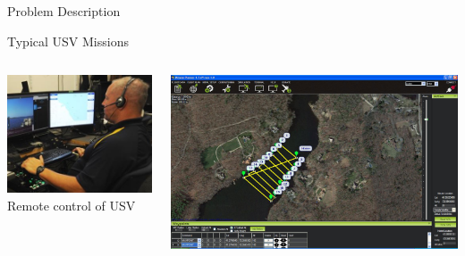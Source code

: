 \documentclass[9pt]{beamer}
\begin{document}
\begin{frame}{Problem Description}
    \begin{block}{Typical USV Missions}
        \begin{columns}
            \begin{column}{0.5\textwidth}
                \begin{block}{}
                    \begin{center}
                        \includegraphics[width=\textwidth]{img/traditional.JPG}
                        \vline
                        \linebreak
                        Remote control of USV
                    \end{center}
                \end{block}
            \end{column}
            \begin{column}{0.5\textwidth}
                \begin{block}{}
                    \begin{center}
                        \includegraphics[width=\textwidth,trim={2cm 2cm 8cm 2cm},clip]{img/Jetyak4Waypoints.jpg}

\end{center}
\end{block}
\end{column}
\end{columns}
\end{block}
\end{frame}
\end{document}
